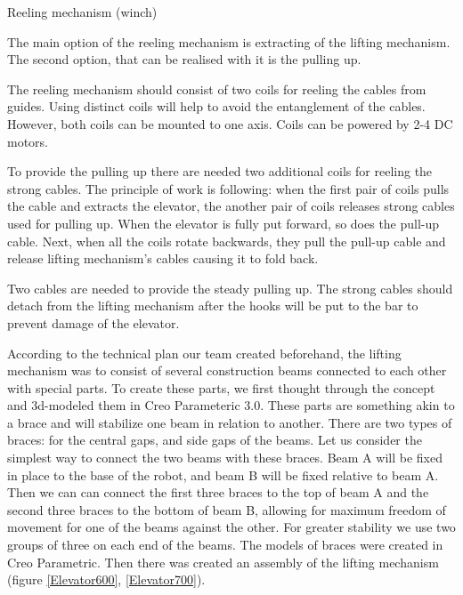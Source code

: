 \begin{enumerate*}
\begin{enumerate*}
\begin{enumerate*}
  	\end{enumerate*}
  	
  	\item Reeling mechanism (winch)
  	\begin{enumerate*}
  		\item The main option of the reeling mechanism is extracting of the lifting mechanism. The second option, that can be realised with it is the pulling up.
  		
  		\item The reeling mechanism should consist of two coils for reeling the cables from guides. Using distinct coils will help to avoid the entanglement of the cables. However, both coils can be mounted to one axis. Coils can be powered by 2-4 DC motors.
  		
  		\item To provide the pulling up there are needed two additional coils for reeling the strong cables. The principle of work is following: when the first pair of coils pulls the cable and extracts the elevator, the another pair of coils releases strong cables used for pulling up. When the elevator is fully put forward, so does the pull-up cable. Next, when all the coils rotate backwards, they pull the pull-up cable and release lifting mechanism's cables causing it to fold back.
  		
  		\item Two cables are needed to provide the steady pulling up. The strong cables should detach from the lifting mechanism after the hooks will be put to the bar to prevent damage of the elevator.
  		
  	\end{enumerate*}
  	
  \end{enumerate*}

  \item According to the technical plan our team created beforehand, the lifting mechanism was to consist of several construction beams connected to each other with special parts. To create these parts, we first thought through the concept and 3d-modeled them in Creo Parameteric 3.0. These parts are something akin to a brace and will stabilize one beam in relation to another. There are two types of braces: for the central gaps, and side gaps of the beams. Let us consider the simplest way to connect the two beams with these braces. Beam A will be fixed in place to the base of the robot, and beam B will be fixed relative to beam A. Then we can can connect the first three braces to the top of beam A and the second three braces to the bottom of beam B, allowing for maximum freedom of movement for one of the beams against the other. For greater stability we use two groups of three on each end of the beams. The models of braces were created in Creo Parametric. Then there was created an assembly of the lifting mechanism (figure \ref{Elevator600}, \ref{Elevator700}).
  

\end{enumerate*}
